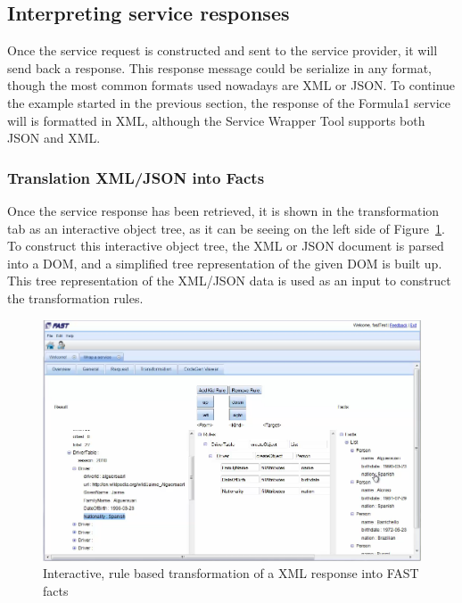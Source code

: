 \documentclass{fast_latex}
\begin{document}

\subsection{Interpreting service responses} %
\label{sub:interpreting_service_responses}

Once the service request is constructed and sent to the service provider, it will send back a response. This response message could be serialize in any format, though the most common formats used nowadays are XML or JSON. To continue the example started in the previous section, the response of the Formula1 service will is formatted in XML, although the Service Wrapper Tool supports both JSON and XML.

\subsubsection{Translation XML/JSON into Facts} %
\label{ssub:translation_xml_into_facts}

Once the service response has been retrieved, it is shown in the transformation tab as an interactive object tree, as it can be seeing on the left side of Figure~\ref{fig:response_service_execution}. To construct this interactive object tree, the XML or JSON document is parsed into a DOM, and a simplified tree representation of the given DOM is built up. This tree representation of the XML/JSON data is used as an input to construct the transformation rules.

\begin{figure}
  \begin{center}
      \includegraphics[angle=90,width=0.8\linewidth]{images/ServiceWrapperToolGVSWithTransformationRulesF1.png}
    \caption{Interactive, rule based transformation of a XML response into FAST facts}
    \label{fig:response_service_execution}
  \end{center}
\end{figure}
\end{document}
